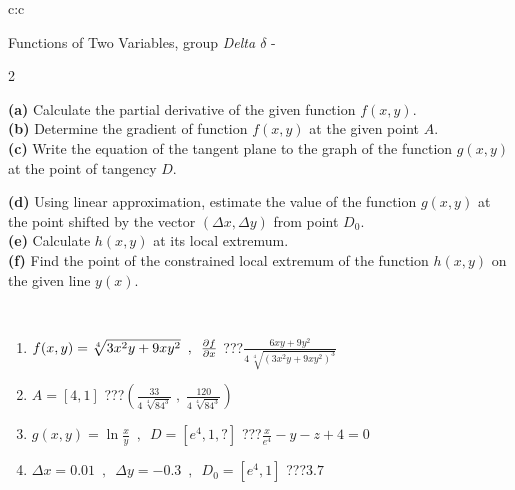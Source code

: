 \documentclass[10pt]{report}
\begin{document}
\begin{tabular}{c:c}
\begin{minipage}[c][104.5mm][t]{0.5\linewidth}
\begin{center}
\vspace{7mm}
{\huge \LARGE Functions of Two Variables, group \textit{Delta $\delta$} -}\\[5mm]
\begin{minipage}{0.95\linewidth}
\begin{center}
{\small \begin{multicols}{2} \raggedright
\textbf{(a)} Calculate the partial derivative of the given function \(f(x,y)\). \\[1mm]
\textbf{(b)} Determine the gradient of function \(f(x,y)\) at the given point \(A\). \\[1mm]
\textbf{(c)} Write the equation of the tangent plane to the graph of the function \(g(x,y)\) at the point of tangency \(D\). \par \columnbreak
\textbf{(d)} Using linear approximation, estimate the value of the function \(g(x,y)\) at the point shifted by the vector \((\Delta x, \Delta y)\) from point \(D_0\). \\[1mm]
\textbf{(e)} Calculate \(h(x,y)\) at its local extremum. \\[1mm]
\textbf{(f)} Find the point of the constrained local extremum of the function \(h(x,y)\) on the given line \(y(x)\). \\[1mm]
\end{multicols}
}
\end{center}
\end{minipage}
\\[4mm]
\begin{minipage}{0.79\linewidth}
\begin{center}
\begin{varwidth}{\linewidth}
\begin{enumerate}
\normalsizerr
\item $f(x,y) = \sqrt[4]{3x^2y + 9xy^2}\enspace , \enspace \pdv{f}{x}$\quad \dotfill\; ???\;\dotfill \quad $\frac{6xy+9y^2}{4\,\sqrt[4]{(3x^2y+9xy^2)^{3}}}$
\item $A = [4, 1]$\quad \dotfill\; ???\;\dotfill \quad $\left( \frac{33}{4\,\sqrt[4]{84^3}} \;,\; \frac{120}{4\,\sqrt[4]{84^3}} \right)$
\item $g(x,y) = \ln\frac{x}{y} \enspace , \enspace D=[e^{4},1,?]$\quad \dotfill\; ???\;\dotfill \quad $\frac{x}{e^4} - y - z + 4 = 0$
\item $\Delta x = {0.01} \enspace,\enspace \Delta y = {-0.3} \enspace,\enspace D_0 = [e^{4},1]$\quad \dotfill\; ???\;\dotfill \quad $3.7$

\end{enumerate}
\end{varwidth}
\end{center}
\end{minipage}
\end{center}
\end{minipage}
\end{tabular}
\end{document}

